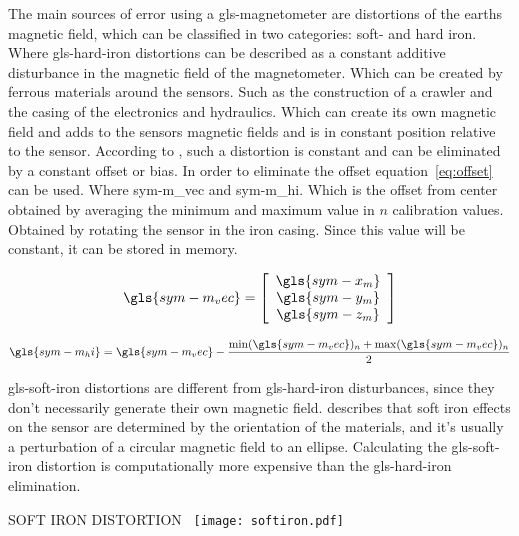 The main sources of error using a \gls{gls-magnetometer} are distortions of the earths magnetic field, which can be
classified in two categories: soft- and hard iron. Where \gls{gls-hard-iron} distortions can be described as a constant
additive disturbance in the magnetic field of the magnetometer. Which can be created by ferrous materials around the
sensors. Such as the construction of a crawler and the casing of the electronics and hydraulics. Which can create its
own magnetic field and adds to the sensors magnetic fields and is in constant position relative to the sensor. According
to \citet{leccadito_kalman_2013}, such a distortion is constant and can be eliminated by a constant offset or bias. In
order to eliminate the offset equation~\ref{eq:offset} can be used. Where \gls{sym-m_vec} and
\gls{sym-m_hi}. Which is the offset from center obtained by averaging the minimum and maximum value in \( n \)
calibration values. Obtained by rotating the sensor in the iron casing. Since this value will be constant, it can be
stored in memory.

\begin{equation}
    \gls{sym-m_vec} =
    \left[\begin{array}{c}
              \gls{sym-x_m} \\
              \gls{sym-y_m} \\
              \gls{sym-z_m}
    \end{array}\right]
\end{equation}

\begin{equation}
    \label{eq:offset}
    \gls{sym-m_hi} = \gls{sym-m_vec} - \frac{\min(\gls{sym-m_vec})_n + \max(\gls{sym-m_vec})_n}{2}
\end{equation}

\gls{gls-soft-iron} distortions are different from \gls{gls-hard-iron} disturbances, since they don't necessarily
generate their own magnetic field. \citet{leccadito_kalman_2013} describes that soft iron effects on the sensor are
determined by the orientation of the materials, and it's usually a perturbation of a circular magnetic field to an
ellipse. Calculating the \gls{gls-soft-iron} distortion is computationally more expensive than the \gls{gls-hard-iron}
elimination.

\begin{RoyalFigure}[!htb, label=fig:ellipse]{SOFT IRON DISTORTION~\cite{konvalin_technical_2008}}
    \texttt{[image: softiron.pdf]}
\end{RoyalFigure}

